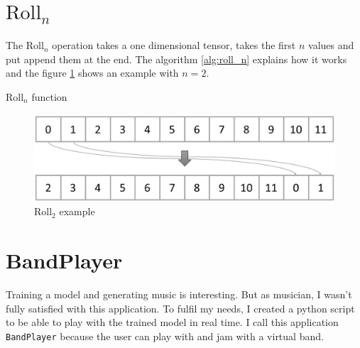\documentclass[12pt]{report}
\begin{document}
\section{$\text{Roll}_n$}
\label{appendix:roll_n}

The $\text{Roll}_n$ operation takes a one dimensional tensor, takes the first $n$ values and put append them at the end.
The algorithm \ref{alg:roll_n} explains how it works and the figure \ref{fig:roll_2} shows an example with $n=2$.

\begin{algorithm}
    \begin{algorithmic}[1]
        \Statex
            \EndFor
            \State {}
        \EndFunction
        \end{algorithmic}
    \caption{$\text{Roll}_n$ function}
    \label{alg:roll_n}
\end{algorithm}

\begin{figure}[ht]
    \centering
    \includegraphics[width=\textwidth]{images/nn/tensor/roll_2.jpg}
    \caption{$\text{Roll}_2$ example}
    \label{fig:roll_2}
\end{figure}

\section{BandPlayer}

Training a model and generating music is interesting.
But as musician, I wasn't fully satisfied with this application.
To fulfil my needs, I created a python script to be able to play with the trained model in real time.
I call this application \texttt{BandPlayer} because the user can play with and jam with a virtual band.
\end{document}
